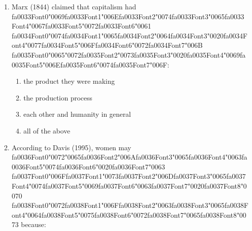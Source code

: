 \documentclass[12pt]{article}
\begin{document}
\begin{enumerate}[label=\arabic*.]
\item Marx (1844) claimed that capitalism had {\csname fa0033Font0\endcsname\char"0069}{\csname fa0033Font1\endcsname\char"006E}{\csname fa0033Font2\endcsname\char"0074}{\csname fa0033Font3\endcsname\char"0065}{\csname fa0033Font4\endcsname\char"0067}{\csname fa0033Font5\endcsname\char"0072}{\csname fa0033Font6\endcsname\char"0061} {\csname fa0034Font0\endcsname\char"0074}{\csname fa0034Font1\endcsname\char"0065}{\csname fa0034Font2\endcsname\char"0064}{\csname fa0034Font3\endcsname\char"0020}{\csname fa0034Font4\endcsname\char"0077}{\csname fa0034Font5\endcsname\char"006F}{\csname fa0034Font6\endcsname\char"0072}{\csname fa0034Font7\endcsname\char"006B} {\csname fa0035Font0\endcsname\char"0065}{\char"0072}{\csname fa0035Font2\endcsname\char"0073}{\csname fa0035Font3\endcsname\char"0020}{\csname fa0035Font4\endcsname\char"0069}{\csname fa0035Font5\endcsname\char"006E}{\csname fa0035Font6\endcsname\char"0074}{\csname fa0035Font7\endcsname\char"006F}:
\begin{enumerate}[label=(\alph*)]
    \item the product they were making
    \item the production process
    \item each other and humanity in general
    \item all of the above
\end{enumerate}
\item According to Davis (1995), women may {\csname fa0036Font0\endcsname\char"0072}{\char"0065}{\csname fa0036Font2\endcsname\char"006A}{\csname fa0036Font3\endcsname\char"0065}{\csname fa0036Font4\endcsname\char"0063}{\csname fa0036Font5\endcsname\char"0074}{\csname fa0036Font6\endcsname\char"0020}{\csname fa0036Font7\endcsname\char"0063} {\csname fa0037Font0\endcsname\char"006F}{\csname fa0037Font1\endcsname\char"0073}{\csname fa0037Font2\endcsname\char"006D}{\csname fa0037Font3\endcsname\char"0065}{\csname fa0037Font4\endcsname\char"0074}{\csname fa0037Font5\endcsname\char"0069}{\csname fa0037Font6\endcsname\char"0063}{\csname fa0037Font7\endcsname\char"0020}{\csname fa0037Font8\endcsname\char"0070} {\csname fa0038Font0\endcsname\char"0072}{\csname fa0038Font1\endcsname\char"006F}{\csname fa0038Font2\endcsname\char"0063}{\csname fa0038Font3\endcsname\char"0065}{\csname fa0038Font4\endcsname\char"0064}{\csname fa0038Font5\endcsname\char"0075}{\csname fa0038Font6\endcsname\char"0072}{\csname fa0038Font7\endcsname\char"0065}{\csname fa0038Font8\endcsname\char"0073} because:
\begin{enumerate}[label=(\alph*)]

\end{enumerate}
\end{enumerate}
\end{document}
